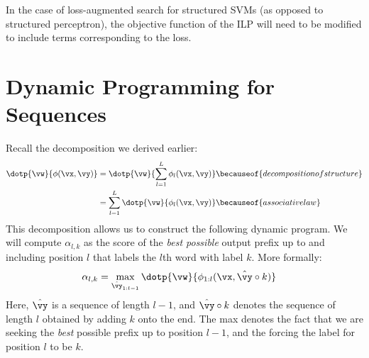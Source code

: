 In the case of loss-augmented search for structured SVMs (as opposed to structured perceptron), the objective function of the ILP will need to be modified to include terms corresponding to the loss.

\section{Dynamic Programming for Sequences} \label{sec:srl:dp}

Recall the decomposition we derived earlier:
%
\begin{align}
  \dotp{\vw}{\phi(\vx,\vy)}
  &= \dotp{\vw}{\sum_{l=1}^L \phi_l(\vx, \vy)} \becauseof{decomposition of structure} \\
  &= \sum_{l=1}^L \dotp{\vw}{\phi_l(\vx, \vy)} \becauseof{associative law}
\end{align}
%
This decomposition allows us to construct the following dynamic program. We will compute $\alpha_{l,k}$ as the score of the \emph{best possible} output prefix up to and including position $l$ that labels the $l$th word with label $k$.
More formally:
\begin{align}
\alpha_{l,k} &= \max_{\hat\vy_{1:l-1}} \dotp{\vw}{\phi_{1:l}(\vx, \hat\vy \circ k)}
\end{align}
Here, $\hat\vy$ is a sequence of length $l-1$, and $\hat\vy \circ k$ denotes the sequence of length $l$ obtained by adding $k$ onto the end.
The max denotes the fact that we are seeking the \emph{best} possible prefix up to position $l-1$, and the forcing the label for position $l$ to be $k$.

